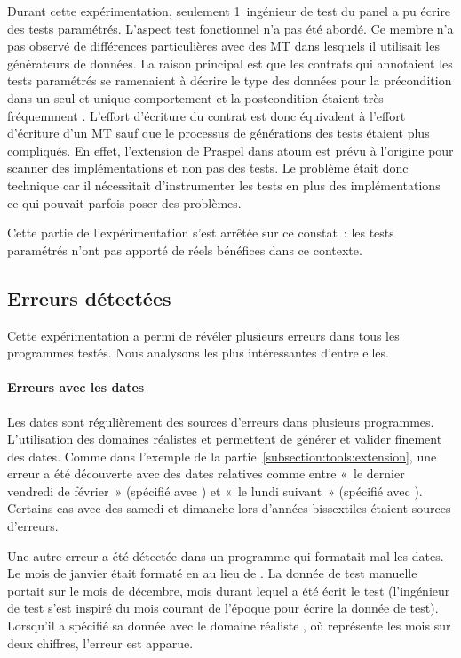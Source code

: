 Durant cette expérimentation, seulement 1~ingénieur de test du panel a pu écrire
des tests paramétrés. L'aspect test fonctionnel n'a pas été abordé. Ce membre
n'a pas observé de différences particulières avec des MT dans lesquels il
utilisait les générateurs de données. La raison principal est que les contrats
qui annotaient les tests paramétrés se ramenaient à décrire le type des données
pour la précondition dans un seul et unique comportement et la postcondition
étaient très fréquemment . L'effort d'écriture du contrat
est donc équivalent à l'effort d'écriture d'un MT sauf que le processus de
générations des tests étaient plus compliqués. En effet, l'extension de Praspel
dans atoum est prévu à l'origine pour scanner des implémentations et non pas des
tests. Le problème était donc technique car il nécessitait d'instrumenter les
tests en plus des implémentations ce qui pouvait parfois poser des problèmes.

Cette partie de l'expérimentation s'est arrêtée sur ce constat~: les tests
paramétrés n'ont pas apporté de réels bénéfices dans ce contexte.

\subsection{Erreurs détectées}

Cette expérimentation a permi de révéler plusieurs erreurs dans tous les
programmes testés. Nous analysons les plus intéressantes d'entre elles.

\paragraph{Erreurs avec les dates} Les dates sont régulièrement des sources
d'erreurs dans plusieurs programmes. L'utilisation des domaines réalistes
 et  permettent de générer et valider finement des
dates. Comme dans l'exemple de la partie~\ref{subsection:tools:extension}, une
erreur a été découverte avec des dates relatives comme entre «~le dernier
vendredi de février~» (spécifié avec ) et «~le lundi suivant~» (spécifié avec ). Certains cas avec des samedi et dimanche lors d'années
bissextiles étaient sources d'erreurs.

Une autre erreur a été détectée dans un programme qui formatait mal les dates.
Le mois de janvier était formaté en  au lieu de . La donnée de
test manuelle portait sur le mois de décembre, mois durant lequel a été écrit le
test (l'ingénieur de test s'est inspiré du mois courant de l'époque pour écrire
la donnée de test). Lorsqu'il a spécifié sa donnée avec le domaine réaliste
, où  représente les mois sur deux chiffres, l'erreur
est apparue.

